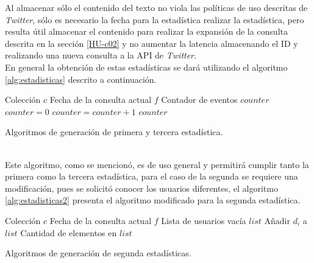 Al almacenar sólo el contenido del texto no viola las políticas de uso descritas de \textit{Twitter}, sólo es necesario la fecha para la estadística realizar la estadística, pero resulta útil almacenar el contenido para realizar la expansión de la consulta descrita en la sección \ref{HU-c02} y no aumentar la latencia almacenando el ID y realizando una nueva consulta a la API de \textit{Twitter}.\\

En general la obtención de estas estadísticas se dará utilizando el algoritmo \ref{alg:estadisticas} descrito a continuación.\\

\begin{algorithm}[H]
	\begin{algorithmic}
		\REQUIRE Colección $c$ 
		\REQUIRE Fecha de la consulta actual $f$ 
		\ENSURE Contador de eventos $counter$  
		\STATE $counter = 0$
				\STATE $counter = counter + 1$
			\ENDIF	
		\ENDFOR
		\RETURN $counter$
	\end{algorithmic}
	\caption{Algoritmos de generación de primera y tercera estadística.}
	\label{alg:estadisticas}
\end{algorithm}\vphantom\\

Este algoritmo, como se mencionó, es de uso general y permitirá cumplir tanto la primera como la tercera estadística, para el caso de la segunda se requiere una modificación, pues se solicitó conocer los usuarios diferentes, el algoritmo \ref{alg:estadisticas2} presenta el algoritmo modificado para la segunda estadística.\\

\begin{algorithm}[H]
	\begin{algorithmic}
		\REQUIRE Colección $c$ 
		\REQUIRE Fecha de la consulta actual $f$ 
		\ENSURE Lista de usuarios vacía $list$  
					\STATE Añadir $d_{i}$ a $list$
				\ENDIF
			\ENDIF	
		\ENDFOR
		\RETURN Cantidad de elementos en $list$
	\end{algorithmic}
	\caption{Algoritmos de generación de segunda estadísticas.}
	\label{alg:estadisticas2}
\end{algorithm}\vphantom\\

